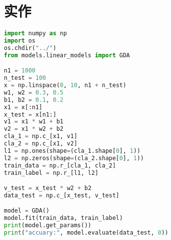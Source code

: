 \documentclass{report}
\begin{document}
\section{实作}
\begin{lstlisting}[language={python}]
import numpy as np
import os
os.chdir("../")
from models.linear_models import GDA

n1 = 1000
n_test = 100
x = np.linspace(0, 10, n1 + n_test)
w1, w2 = 0.3, 0.5
b1, b2 = 0.1, 0.2
x1 = x[:n1]
x_test = x[n1:]
v1 = x1 * w1 + b1
v2 = x1 * w2 + b2
cla_1 = np.c_[x1, v1]
cla_2 = np.c_[x1, v2]
l1 = np.ones(shape=(cla_1.shape[0], 1))
l2 = np.zeros(shape=(cla_2.shape[0], 1))
train_data = np.r_[cla_1, cla_2]
train_label = np.r_[l1, l2]

v_test = x_test * w2 + b2
data_test = np.c_[x_test, v_test]

model = GDA()
model.fit(train_data, train_label)
print(model.get_params())
print("accuary:", model.evaluate(data_test, 0))
\end{lstlisting}
\end{document}
